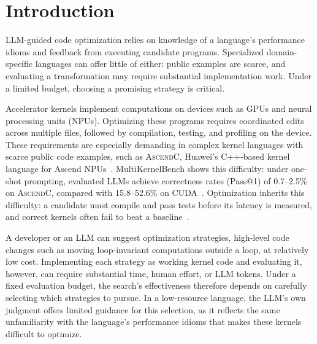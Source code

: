 \documentclass[acmsmall,screen,review,anonymous,nonacm]{acmart}
\newcommand{\ascendc}{\textsc{AscendC}\xspace}
\begin{document}

\maketitle
\section{Introduction}

LLM-guided code optimization relies on knowledge of a language's performance
idioms and feedback from executing candidate programs. Specialized
domain-specific languages can offer little of either: public examples are
scarce, and evaluating a transformation may require substantial implementation
work. Under a limited budget, choosing a promising strategy is critical.

Accelerator kernels implement computations on devices such as GPUs and neural
processing units (NPUs). Optimizing these programs requires coordinated edits
across multiple files, followed by compilation, testing, and profiling on the
device. These requirements are especially demanding in complex kernel
languages with scarce public code examples, such as \ascendc, Huawei's
C++-based kernel language for Ascend NPUs~\citep{Cao2026AscendKernelGen}.
MultiKernelBench shows this difficulty: under one-shot prompting,
evaluated LLMs achieve correctness rates (Pass@1) of 0.7--2.5\% on \ascendc,
compared with 15.8--52.6\% on CUDA~\citep{Wen2025MultiKernelBench}.
Optimization inherits this difficulty: a candidate must compile and pass tests
before its latency is measured, and correct kernels often fail to beat a
baseline~\citep{Ouyang2025KernelBench}.

A developer or an LLM can suggest optimization strategies, high-level code
changes such as moving loop-invariant computations outside a loop, at
relatively low cost. Implementing each strategy as working kernel code and
evaluating it, however, can require substantial time, human effort, or LLM
tokens. Under a fixed evaluation budget, the search's effectiveness therefore
depends on carefully selecting which strategies to pursue. In a
low-resource language, the LLM's own judgment offers limited guidance for this
selection, as it reflects the same unfamiliarity with the language's
performance idioms that makes these kernels difficult to optimize.
\end{document}
